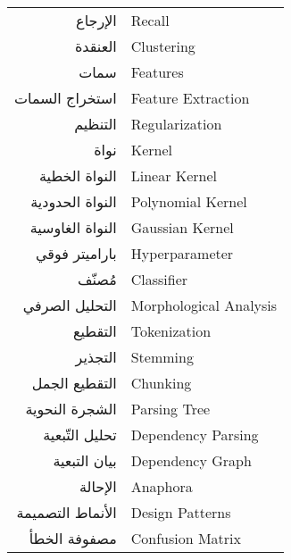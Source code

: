\begin{doublespacing}
\begin{center}
\begin{longtable}{r l}
			الإرجاع			& 			\textenglish{Recall}				\\
			
			
			العنقدة			& 			\textenglish{Clustering}				\\
			
			
			سمات			& 				\textenglish{Features}				\\
			
			
			استخراج السمات		& 				\textenglish{Feature Extraction}				\\
			
			
			التنظيم		& 			\textenglish{Regularization}	\\
			
			
			نواة		& 			\textenglish{Kernel}	\\
			
			النواة الخطية		& 			\textenglish{Linear Kernel}		\\
			
			النواة الحدودية		& 			\textenglish{Polynomial Kernel}		\\
			
			النواة الغاوسية		& 			\textenglish{Gaussian Kernel}		\\
			
			باراميتر فوقي		& 			\textenglish{Hyperparameter}		\\
			
			مُصنّف	& 			\textenglish{Classifier}		\\
			
			التحليل الصرفي	& 			\textenglish{Morphological Analysis}		\\
			
			التقطيع		& 			\textenglish{Tokenization}		\\
			
			التجذير	& 			\textenglish{Stemming}		\\
			
			التقطيع الجمل		& 			\textenglish{Chunking}		\\
			
			الشجرة النحوية		& 			\textenglish{Parsing Tree}		\\
			
			تحليل التّبعية		& 			\textenglish{Dependency Parsing}		\\
			
			بيان التبعية		& 			\textenglish{Dependency Graph}		\\
			
			الإحالة		& 			\textenglish{Anaphora}		\\
			
			الأنماط التصميمة		& 			\textenglish{Design Patterns}		\\
			
			مصفوفة الخطأ		& 			\textenglish{Confusion Matrix}		\\
			
		\end{longtable}
	\end{center}
\end{doublespacing}

